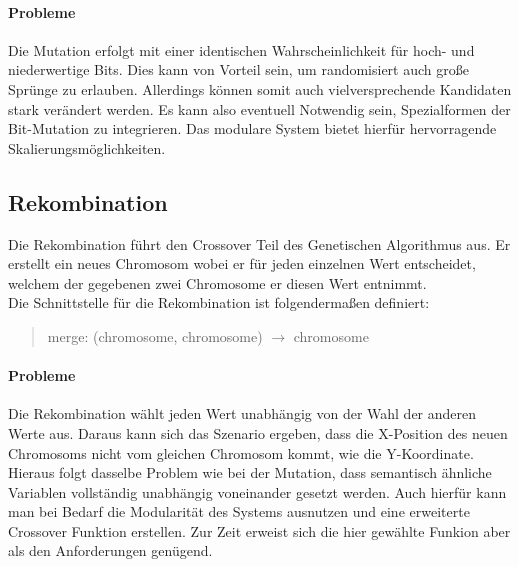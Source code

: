 \documentclass[12pt,a4paper]{scrartcl}
\begin{document}
\paragraph{Probleme} Die Mutation erfolgt mit einer identischen Wahrscheinlichkeit für hoch- und niederwertige Bits. Dies kann von Vorteil sein, um randomisiert auch große Sprünge zu erlauben. Allerdings können somit auch vielversprechende Kandidaten stark verändert werden. Es kann also eventuell Notwendig sein, Spezialformen der Bit-Mutation zu integrieren. Das modulare System bietet hierfür hervorragende Skalierungsmöglichkeiten.

\subsection{Rekombination}
Die Rekombination führt den Crossover Teil des Genetischen Algorithmus aus. Er erstellt ein neues Chromosom wobei er für jeden einzelnen Wert entscheidet, welchem der gegebenen zwei Chromosome er diesen Wert entnimmt.\\
Die Schnittstelle für die Rekombination ist folgendermaßen definiert: 
\begin{quote}
	\textsf{merge: (chromosome, chromosome) $\rightarrow$ chromosome}
\end{quote}
\paragraph{Probleme} Die Rekombination wählt jeden Wert unabhängig von der Wahl der anderen Werte aus. Daraus kann sich das Szenario ergeben, dass die X-Position des neuen Chromosoms nicht vom gleichen Chromosom kommt, wie die Y-Koordinate. Hieraus folgt dasselbe Problem wie bei der Mutation, dass semantisch ähnliche Variablen vollständig unabhängig voneinander gesetzt werden. Auch hierfür kann man bei Bedarf die Modularität des Systems ausnutzen und eine erweiterte Crossover Funktion erstellen. Zur Zeit erweist sich die hier gewählte Funkion aber als den Anforderungen genügend.
\end{document}
